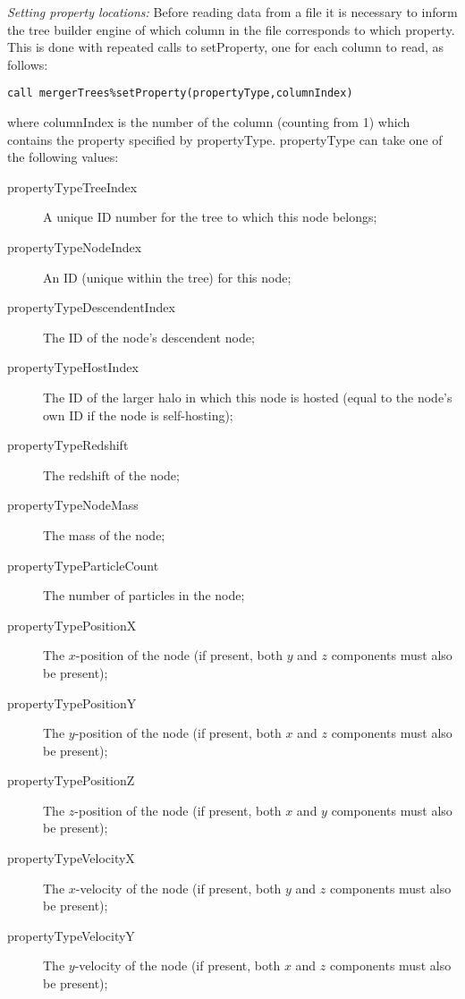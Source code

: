 \noindent \emph{Setting property locations:} Before reading data from a file it is necessary to inform the tree builder engine of which column in the file corresponds to which property. This is done with repeated calls to {\normalfont \ttfamily setProperty}, one for each column to read, as follows:
\begin{verbatim}
call mergerTrees%setProperty(propertyType,columnIndex)
\end{verbatim}
where {\normalfont \ttfamily columnIndex} is the number of the column (counting from 1) which contains the property specified by {\normalfont \ttfamily propertyType}. {\normalfont \ttfamily propertyType} can take one of the following values:
\begin{description}
 \item [{\normalfont \ttfamily propertyTypeTreeIndex}] A unique ID number for the tree to which this node belongs;
 \item [{\normalfont \ttfamily propertyTypeNodeIndex}] An ID (unique within the tree) for this node;
 \item [{\normalfont \ttfamily propertyTypeDescendentIndex}] The ID of the node's descendent node;
 \item [{\normalfont \ttfamily propertyTypeHostIndex}] The ID of the larger halo in which this node is hosted (equal to the node's own ID if the node is self-hosting);
 \item [{\normalfont \ttfamily propertyTypeRedshift}] The redshift of the node;
 \item [{\normalfont \ttfamily propertyTypeNodeMass}] The mass of the node;
 \item [{\normalfont \ttfamily propertyTypeParticleCount}] The number of particles in the node;
 \item [{\normalfont \ttfamily propertyTypePositionX}] The $x$-position of the node (if present, both $y$ and $z$ components must also be present);
 \item [{\normalfont \ttfamily propertyTypePositionY}] The $y$-position of the node (if present, both $x$ and $z$ components must also be present);
 \item [{\normalfont \ttfamily propertyTypePositionZ}] The $z$-position of the node (if present, both $x$ and $y$ components must also be present);
 \item [{\normalfont \ttfamily propertyTypeVelocityX}] The $x$-velocity of the node (if present, both $y$ and $z$ components must also be present);
 \item [{\normalfont \ttfamily propertyTypeVelocityY}] The $y$-velocity of the node (if present, both $x$ and $z$ components must also be present);

\end{description}
